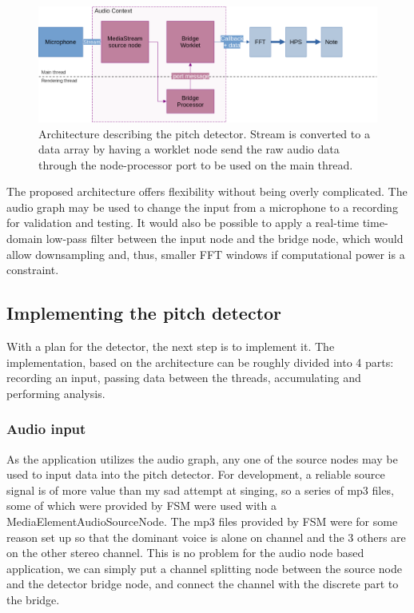 \begin{figure}[ht]
    \centering
    \includegraphics[width=\textwidth]{./images/pdArchitecture.png}
    \caption{Architecture describing the pitch detector. Stream is converted to a data array by having a worklet node send the raw audio data through the node-processor port to be used on the main thread.\label{fig:pdArch}}
\end{figure}

The proposed architecture offers flexibility without being overly complicated. The audio graph may be used to change the input from a microphone to a recording for validation and testing. It would also be possible to apply a real-time time-domain low-pass filter between the input node and the bridge node, which would allow downsampling and, thus, smaller FFT windows if computational power is a constraint. 

\subsection{Implementing the pitch detector}
With a plan for the detector, the next step is to implement it. The implementation, based on the architecture can be roughly divided into 4 parts: recording an input, passing data between the threads, accumulating and performing analysis.

\subsubsection{Audio input}
As the application utilizes the audio graph, any one of the source nodes may be used to input data into the pitch detector. For development, a reliable source signal is of more value than my sad attempt at singing, so a series of mp3 files, some of which were provided by FSM were used with a MediaElementAudioSourceNode. The mp3 files provided by FSM were for some reason set up so that the dominant voice is alone on channel and the 3 others are on the other stereo channel. This is no problem for the audio node based application, we can simply put a channel splitting node between the source node and the detector bridge node, and connect the channel with the discrete part to the bridge.


